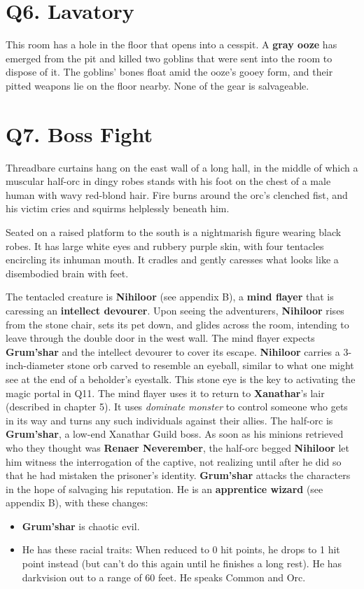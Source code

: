 \documentclass[10pt,a4paper,twoside,twocolumn,openany,nodeprecatedcode]{dndbook}
\begin{document}
\section{Q6. Lavatory}
This room has a hole in the floor that opens into a cesspit. A \textbf{gray ooze} has emerged from the pit and killed two goblins that were sent into the room to dispose of it. The goblins' bones float amid the ooze's gooey form, and their pitted weapons lie on the floor nearby. None of the gear is salvageable.
\section{Q7. Boss Fight}
\begin{DndReadAloud}{}
Threadbare curtains hang on the east wall of a long hall, in the middle of which a muscular half-orc in dingy robes stands with his foot on the chest of a male human with wavy red-blond hair. Fire burns around the orc's clenched fist, and his victim cries and squirms helplessly beneath him.

Seated on a raised platform to the south is a nightmarish figure wearing black robes. It has large white eyes and rubbery purple skin, with four tentacles encircling its inhuman mouth. It cradles and gently caresses what looks like a disembodied brain with feet.
\end{DndReadAloud}

The tentacled creature is \textbf{Nihiloor} (see appendix B), a \textbf{mind flayer} that is caressing an \textbf{intellect devourer}. Upon seeing the adventurers, \textbf{Nihiloor} rises from the stone chair, sets its pet down, and glides across the room, intending to leave through the double door in the west wall. The mind flayer expects \textbf{Grum'shar} and the intellect devourer to cover its escape.
\textbf{Nihiloor} carries a 3-inch-diameter stone orb carved to resemble an eyeball, similar to what one might see at the end of a beholder's eyestalk. This stone eye is the key to activating the magic portal in Q11. The mind flayer uses it to return to \textbf{Xanathar}'s lair (described in chapter 5). It uses \textit{dominate monster} to control someone who gets in its way and turns any such individuals against their allies.
The half-orc is \textbf{Grum'shar}, a low-end Xanathar Guild boss. As soon as his minions retrieved who they thought was \textbf{Renaer Neverember}, the half-orc begged \textbf{Nihiloor} let him witness the interrogation of the captive, not realizing until after he did so that he had mistaken the prisoner's identity. \textbf{Grum'shar} attacks the characters in the hope of salvaging his reputation. He is an \textbf{apprentice wizard} (see appendix B), with these changes:
\begin{itemize}

\item \textbf{Grum'shar} is chaotic evil.
\item He has these racial traits: When reduced to 0 hit points, he drops to 1 hit point instead (but can't do this again until he finishes a long rest). He has darkvision out to a range of 60 feet. He speaks Common and Orc.
\end{itemize}
\end{document}
